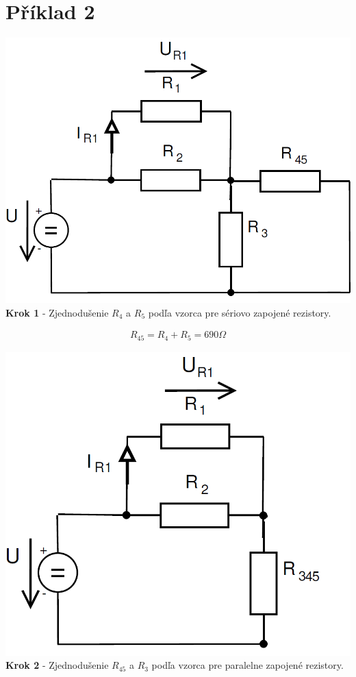 \section{Příklad 2}

\begin{center}
\includegraphics[scale=0.5,keepaspectratio]{fig/obr/Pr2_1.png} \\
\textbf{Krok 1} - Zjednodušenie $R_{4}$ a $R_{5}$ podľa vzorca pre sériovo zapojené rezistory.
\end{center}

\begin{gather*}
R_{45}=R_{4} + R_{5}=690\Omega 
\end{gather*}


\begin{center}
\includegraphics[scale=0.5,keepaspectratio]{fig/obr/Pr2_2.png} \\
\textbf{Krok 2} - Zjednodušenie $R_{45}$ a $R_{3}$ podľa vzorca pre paralelne zapojené rezistory.
\end{center}

